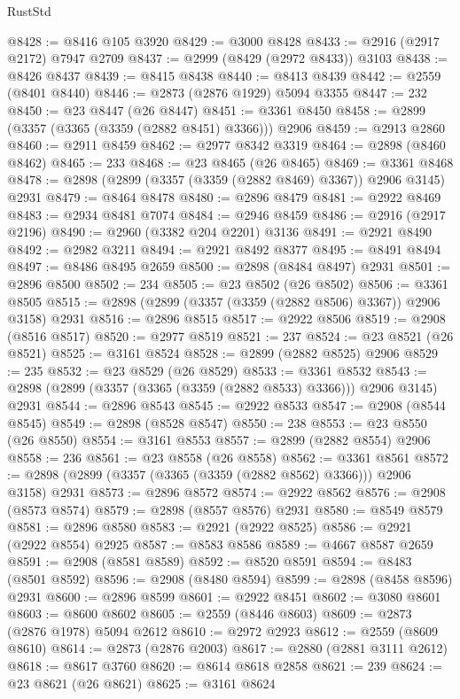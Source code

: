 \begin{lexlean}{RustStd}
\begin{coremodule}
@8428 := @8416 @105 @3920
@8429 := @3000 @8428
@8433 := @2916 (@2917 @2172) @7947 @2709
@8437 := @2999 (@8429 (@2972 @8433)) @3103
@8438 := @8426 @8437
@8439 := @8415 @8438
@8440 := @8413 @8439
@8442 := @2559 (@8401 @8440)
@8446 := @2873 (@2876 @1929) @5094 @3355
@8447 := 232
@8450 := @23 @8447 (@26 @8447)
@8451 := @3361 @8450
@8458 := @2899 (@3357 (@3365 (@3359 (@2882 @8451) @3366))) @2906
@8459 := @2913 @2860
@8460 := @2911 @8459
@8462 := @2977 @8342 @3319
@8464 := @2898 (@8460 @8462)
@8465 := 233
@8468 := @23 @8465 (@26 @8465)
@8469 := @3361 @8468
@8478 := @2898 (@2899 (@3357 (@3359 (@2882 @8469) @3367)) @2906 @3145) @2931
@8479 := @8464 @8478
@8480 := @2896 @8479
@8481 := @2922 @8469
@8483 := @2934 @8481 @7074
@8484 := @2946 @8459
@8486 := @2916 (@2917 @2196)
@8490 := @2960 (@3382 @204 @2201) @3136
@8491 := @2921 @8490
@8492 := @2982 @3211
@8494 := @2921 @8492 @8377
@8495 := @8491 @8494
@8497 := @8486 @8495 @2659
@8500 := @2898 (@8484 @8497) @2931
@8501 := @2896 @8500
@8502 := 234
@8505 := @23 @8502 (@26 @8502)
@8506 := @3361 @8505
@8515 := @2898 (@2899 (@3357 (@3359 (@2882 @8506) @3367)) @2906 @3158) @2931
@8516 := @2896 @8515
@8517 := @2922 @8506
@8519 := @2908 (@8516 @8517)
@8520 := @2977 @8519
@8521 := 237
@8524 := @23 @8521 (@26 @8521)
@8525 := @3161 @8524
@8528 := @2899 (@2882 @8525) @2906
@8529 := 235
@8532 := @23 @8529 (@26 @8529)
@8533 := @3361 @8532
@8543 := @2898 (@2899 (@3357 (@3365 (@3359 (@2882 @8533) @3366))) @2906 @3145) @2931
@8544 := @2896 @8543
@8545 := @2922 @8533
@8547 := @2908 (@8544 @8545)
@8549 := @2898 (@8528 @8547)
@8550 := 238
@8553 := @23 @8550 (@26 @8550)
@8554 := @3161 @8553
@8557 := @2899 (@2882 @8554) @2906
@8558 := 236
@8561 := @23 @8558 (@26 @8558)
@8562 := @3361 @8561
@8572 := @2898 (@2899 (@3357 (@3365 (@3359 (@2882 @8562) @3366))) @2906 @3158) @2931
@8573 := @2896 @8572
@8574 := @2922 @8562
@8576 := @2908 (@8573 @8574)
@8579 := @2898 (@8557 @8576) @2931
@8580 := @8549 @8579
@8581 := @2896 @8580
@8583 := @2921 (@2922 @8525)
@8586 := @2921 (@2922 @8554) @2925
@8587 := @8583 @8586
@8589 := @4667 @8587 @2659
@8591 := @2908 (@8581 @8589)
@8592 := @8520 @8591
@8594 := @8483 (@8501 @8592)
@8596 := @2908 (@8480 @8594)
@8599 := @2898 (@8458 @8596) @2931
@8600 := @2896 @8599
@8601 := @2922 @8451
@8602 := @3080 @8601
@8603 := @8600 @8602
@8605 := @2559 (@8446 @8603)
@8609 := @2873 (@2876 @1978) @5094 @2612
@8610 := @2972 @2923
@8612 := @2559 (@8609 @8610)
@8614 := @2873 (@2876 @2003)
@8617 := @2880 (@2881 @3111 @2612)
@8618 := @8617 @3760
@8620 := @8614 @8618 @2858
@8621 := 239
@8624 := @23 @8621 (@26 @8621)
@8625 := @3161 @8624

\end{coremodule}
\end{lexlean}
